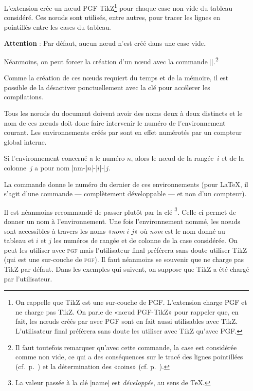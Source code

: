\documentclass[dvipsnames]{article}%
\begin{document}

L'extension  crée un nœud PGF-TikZ\footnote{On rappelle que TikZ
  est une sur-couche de PGF. L'extension  charge PGF et ne
  charge pas TikZ. On parle de «nœud PGF-TikZ» pour rappeler que, en fait, les
  nœuds créés par  avec PGF sont en fait aussi utilisables avec
  TikZ. L'utilisateur final préférera sans doute les utiliser avec TikZ qu'avec
  PGF.} pour chaque case non vide du tableau considéré. Ces nœuds sont utilisés,
entre autres, pour tracer les lignes en pointillés entre les cases du tableau.

\smallskip
\textbf{Attention} : Par défaut, aucun nœud n'est créé dans une case vide.

\smallskip
Néanmoins, on peut forcer la création d'un nœud avec la commande |\NotEmpty|.\footnote{Il faut toutefois remarquer qu'avec cette commande, la
  case est considérée comme non vide, ce qui a des conséquences sur le tracé des
lignes pointillées (cf.~p.~\pageref{Cdots}) et la détermination des «coins»
(cf. p.~\pageref{corners}).}

\medskip
Comme la création de ces nœuds requiert du temps et de la mémoire, il est
possible de la désactiver ponctuellement avec la clé 
pour accélerer les compilations. 

\medskip
Tous les nœuds du document doivent avoir des noms deux à deux distincts et le
nom de ces nœuds doit donc faire intervenir le numéro de l'environnement
courant. Les environnements créés par  sont en effet numérotés
par un compteur global interne.

\smallskip
Si l'environnement concerné a le numéro $n$, alors le nœud de la rangée~$i$ et
de la colonne~$j$ a pour nom |nm-|$n$|-|$i$|-|$j$.

\smallskip
{}
La commande  donne le numéro du dernier de
ces environnements (pour LaTeX, il s'agit d'une commande — complètement
développable — et non d'un compteur).

\smallskip
{}
Il est néanmoins recommandé de passer plutôt par la clé \footnote{La
  valeur passée à la clé |name| est \emph{développée}, au sens de TeX.}.
Celle-ci permet de donner un nom à l'environnement. Une fois l'environnement
nommé, les nœuds sont accessibles à travers les noms «\textsl{nom}-$i$-$j$» où
\textsl{nom} est le nom donné au tableau et $i$ et $j$ les numéros de rangée et
de colonne de la case considérée. On peut les utiliser avec \textsc{pgf} mais
l'utilisateur final préférera sans doute utiliser TikZ (qui est une sur-couche
de \textsc{pgf}). Il faut néanmoins se souvenir que  ne charge
pas TikZ par défaut. Dans les exemples qui suivent, on suppose que TikZ a été
chargé par l'utilisateur.
\end{document}
